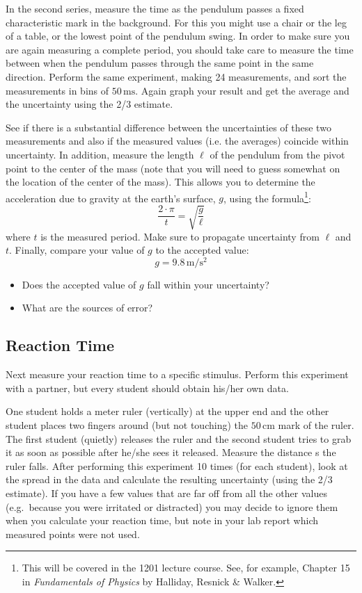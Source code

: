 \documentclass{article}
\begin{document}
In the second series, measure the time as the pendulum passes a fixed characteristic mark in the background. For this you might use a chair or the leg of a table, or the lowest point of the pendulum swing. In order to make sure you are again measuring a complete period, you should take care to measure the time between when the pendulum passes through the same point in the same direction. Perform the same experiment, making 24 measurements, and sort the measurements in bins of $50\,\mathrm{ms}$. Again graph your result and get the average and the uncertainty using the 2/3 estimate.\myskip

See if there is a substantial difference between the uncertainties of these two measurements and also if the measured values (i.e. the averages) coincide within uncertainty. In addition, measure the length $\ell$ of the pendulum from the pivot point to the center of the mass (note that you will need to guess somewhat on the location of the center of the mass). This allows you to determine the acceleration due to gravity at the earth's surface, $g$, using the formula\footnote{This will be covered in the 1201 lecture course. See, for example, Chapter 15 in \emph{Fundamentals of Physics} by Halliday, Resnick \& Walker.}:
\begin{equation}
    \frac{2\cdot \pi}{t} = \sqrt{\frac{g}{\ell}}
\end{equation}
where $t$ is the measured period. Make sure to propagate uncertainty from $\ell$ and $t$. Finally, compare your value of $g$ to the accepted value:
\begin{equation}
    g = 9.8\,\mathrm{m/s^2}
\end{equation}

\begin{itemize}
    \item Does the accepted value of $g$ fall within your uncertainty?
    \item What are the sources of error?
\end{itemize}

\subsection{Reaction Time}

Next measure your reaction time to a specific stimulus. Perform this experiment with a partner, but every student should obtain his/her own data.\myskip

One student holds a meter ruler (vertically) at the upper end and the other student places two fingers around (but not touching) the $50\,\mathrm{cm}$ mark of the ruler. The first student (quietly) releases the ruler and the second student tries to grab it as soon as possible after he/she sees it released. Measure the distance s the ruler falls. After performing this experiment 10 times (for each student), look at the spread in the data and calculate the resulting uncertainty (using the 2/3 estimate). If you have a few values that are far off from all the other values (e.g.\ because you were irritated or distracted) you may decide to ignore them when you calculate your reaction time, but note in your lab report which measured points were not used.\myskip
\end{document}
